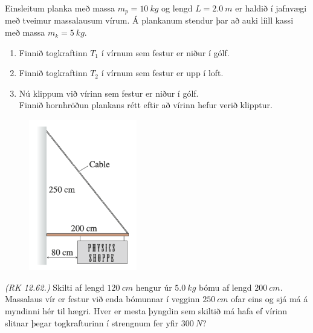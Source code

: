 \begin{enumerate}[label = \textbf{Dæmi \thechapter.\arabic*.}]
\begin{minipage}{\linewidth}
\item Einsleitum planka með massa $m_p = \SI{10}{kg}$ og lengd $L = \SI{2.0}{m}$ er haldið í jafnvægi með tveimur massalausum vírum. Á plankanum stendur þar að auki líill kassi með massa $m_k = \SI{5}{kg}$.
\end{minipage}

\begin{enumerate}[label = \textbf{(\alph*)}]
    \item Finnið togkraftinn $T_1$ í vírnum sem festur er niður í gólf.
    
    \item Finnið togkraftinn $T_2$ í vírnum sem festur er upp í loft.
    
    \item Nú klippum við vírinn sem festur er niður í gólf. \\ Finnið hornhröðun plankans
    rétt eftir að vírinn hefur verið klipptur.
    
\end{enumerate}

\vspace{0.75cm}


\begin{minipage}{\linewidth}

\begin{figure}
\vspace{-0.75cm}
\includegraphics[width=1.85in]{images/vir.png}
\end{figure}

\item \textit{(RK 12.62.)} Skilti af lengd $\SI{120}{cm}$ hengur úr $\SI{5.0}{kg}$ bómu af lengd $\SI{200}{cm}$. Massalaus vír er festur við enda bómunnar í vegginn $\SI{250}{cm}$ ofar eins og sjá má á myndinni hér til hægri. Hver er mesta þyngdin sem skiltið má hafa ef vírinn slitnar þegar togkrafturinn í strengnum fer yfir $\SI{300}{N}$?


\end{minipage}
\end{enumerate}
